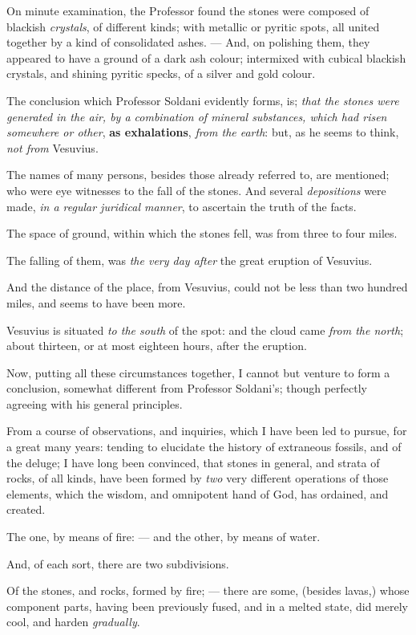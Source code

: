 \documentclass[a4paper, 12pt, oneside, twocolumn]{article}
\begin{document}
On minute examination, the Professor found the stones were composed of blackish \emph{crystals}, of different kinds; with metallic or pyritic spots, all united together by a kind of consolidated ashes. --- And, on polishing them, they appeared to have a ground of a dark ash colour; intermixed with cubical blackish crystals, and shining pyritic specks, of a silver and gold colour.

The conclusion which Professor Soldani evidently forms, is; \emph{that the stones were generated in the air, by a combination of mineral substances, which had risen somewhere or other}, \textbf{as exhalations}, \emph{from the earth}: but, as he seems to think, \emph{not from} Vesuvius.

The names of many persons, besides those already referred to, are mentioned; who were eye witnesses to the fall of the stones. And several \emph{depositions} were made, \emph{in a regular juridical manner}, to ascertain the truth of the facts.

The space of ground, within which the stones fell, was from three to four miles.

The falling of them, was \emph{the very day after} the great eruption of Vesuvius.

And the distance of the place, from Vesuvius, could not be less than two hundred miles, and seems to have been more.

Vesuvius is situated \emph{to the south} of the spot: and the cloud came \emph{from the north}; about thirteen, or at most eighteen hours, after the eruption.

Now, putting all these circumstances together, I cannot but venture to form a conclusion, somewhat different from Professor Soldani's; though perfectly agreeing with his general principles.

From a course of observations, and inquiries, which I have been led to pursue, for a great many years: tending to elucidate the history of extraneous fossils, and of the deluge; I have long been convinced, that stones in general, and strata of rocks, of all kinds, have been formed by \emph{two} very different operations of those elements, which the wisdom, and omnipotent hand of God, has ordained, and created.

The one, by means of fire: --- and the other, by means of water.

And, of each sort, there are two subdivisions.

Of the stones, and rocks, formed by fire; --- there are some, (besides lavas,) whose component parts, having been previously fused, and in a melted state, did merely cool, and harden \emph{gradually}.
\end{document}
